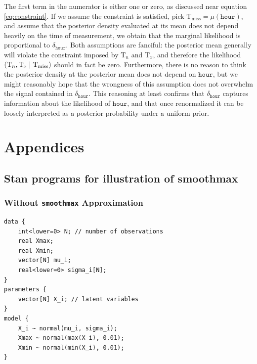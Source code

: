 \documentclass[letter]{article}
\newcommand{\genericdel}[3]{%
      \left#1#3\right#2
    }
\newcommand{\del}[1]{\genericdel(){#1}}
\let\Pr\relax
\DeclareMathOperator{\Pr}{\mathbb{P}}
\newcommand{\T}{\mathrm{T}}
\newcommand{\Tn}{\T_{n}}
\newcommand{\Tx}{\T_{x}}
\newcommand{\miss}{\mathrm{miss}}
\newcommand{\hour}{\mathtt{hour}}
\newcommand{\discrepancy}{\delta}
\begin{document}
The first term in the numerator is either one or zero, as discussed near equation \eqref{eq:constraint}.
If we assume the constraint is satisfied,
pick \(\T_\miss = \mu\del{\hour}\),
and assume that the posterior density evaluated at its mean
does not depend heavily on the time of measurement,
we obtain that the marginal likelihood is proportional to \(\discrepancy_\hour\).
Both assumptions are fanciful: the posterior mean generally will violate the constraint imposed by \(\Tn\) and \(\Tx\), and therefore the likelihood \(\Pr\del{\Tn,\Tx \mid \T_\miss}\) should in fact be zero.
Furthermore, there is no reason to think the posterior density at the posterior mean does not depend on \(\hour\), but we might reasonably hope that the wrongness of this assumption does not overwhelm the signal contained in \(\discrepancy_\hour\).
This reasoning at least confirms that \(\discrepancy_\hour\) captures information about the likelihood of \(\hour\), and that once renormalized it can be loosely interpreted as a posterior probability under a uniform prior.
    


        \section{Appendices}\label{appendices}

\subsection{Stan programs for illustration of smoothmax}\label{stan-programs-for-illustration-of-smoothmax}
    

\label{sec:stan_illustration}
        \subsubsection{\texorpdfstring{Without \texttt{smoothmax} Approximation}{Without smoothmax Approximation}}\label{without-smoothmax-approximation}
    


        \begin{verbatim}
data {
    int<lower=0> N; // number of observations
    real Xmax;
    real Xmin;
    vector[N] mu_i;
    real<lower=0> sigma_i[N];
}
parameters {
    vector[N] X_i; // latent variables
}
model {
    X_i ~ normal(mu_i, sigma_i);
    Xmax ~ normal(max(X_i), 0.01);
    Xmin ~ normal(min(X_i), 0.01);
}
\end{verbatim}
    
\end{document}
